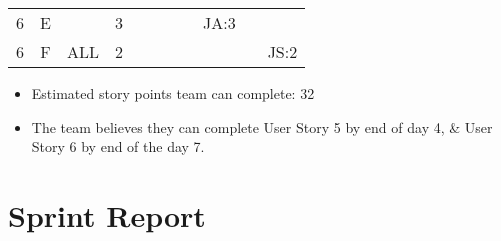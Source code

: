\documentclass[12pt]{article}
\begin{document}
\begin{table}[H]
\begin{tabular}{@{}c|c|c|c|ccccccc@{}}
6     & E    &            & 3                                                      &                                                 &                                                 &                                                  &                                                  & JA:3                                             &                                                  &                                                  \\ 
6     & F    & ALL        & 2                                                      &                                                 &                                                 &                                                  &                                                  &                                                  &                                                  & JS:2                                             \\ \bottomrule
\end{tabular}
\end{table}

\begin{itemize}%
\item Estimated story points team can complete: 32
\item The team believes they can complete User Story 5 by end of day 4, \& User Story 6 by end of the day 7. 
\end{itemize}

\newpage

\section{Sprint Report}
\end{document}
